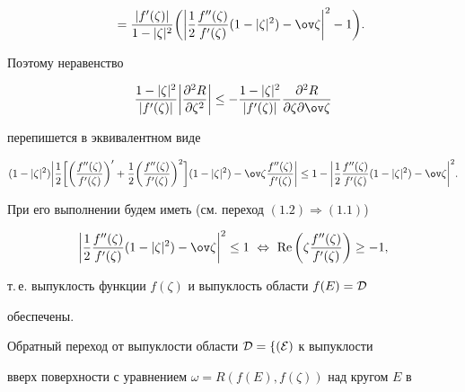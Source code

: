 \begin{pf}
\begin{align*}
% 


&\qquad =\frac{|f'(\zeta)|}{1-|\zeta|^2}\bigg(\bigg|\frac{1}{2} 


\frac{f''(\zeta)}{f'(\zeta)}(1-|\zeta|^2)-\ov\zeta\bigg|^2 


-1\bigg). 


\end{align*} 


Поэтому неравенство 


$$ 


\frac{1-|\zeta|^2}{|f'(\zeta)|}\bigg| 


\frac{\partial ^2R}{\partial \zeta^2}\bigg|\le 


-\frac{1-|\zeta|^2}{|f'(\zeta)|} 


\frac{\partial ^2R}{\partial \zeta\partial \ov\zeta} 


$$ 


перепишется в эквивалентном виде 


$$ 


(1-|\zeta|^2)\bigg|\frac{1}{2}\bigg[\bigg( 


\frac{f''(\zeta)}{f'(\zeta)}\bigg)'+\frac{1}{2}\bigg( 


\frac{f''(\zeta)}{f'(\zeta)}\bigg)^2\bigg] 


(1-|\zeta|^2)-\ov\zeta\frac{f''(\zeta)}{f'(\zeta)}\bigg| 


\le1-\bigg|\frac{1}{2}\frac{f''(\zeta)}{f'(\zeta)} 


(1-|\zeta|^2)-\ov\zeta\bigg|^2. 


$$ 


При его выполнении будем иметь (см. переход $(1.2)\Rightarrow(1.1)$) 


$$ 


\bigg|\frac{1}{2}\frac{f''(\zeta)}{f'(\zeta)} 


(1-|\zeta|^2)-\ov\zeta\bigg|^2\le1 


\ \Leftrightarrow \ \re\bigg(\zeta 


\frac{f''(\zeta)}{f'(\zeta)}\bigg)\ge-1, 


$$ 


т.\,е. выпуклость функции $f(\zeta)$ и выпуклость области $f(E)=\cal D$ 


обеспечены. 


 


Обратный переход от выпуклости области $\cal D=f(E)$ к выпуклости 


вверх поверхности с уравнением $\omega=R(f(E),f(\zeta))$ над кругом $E$ в 



\end{pf}
